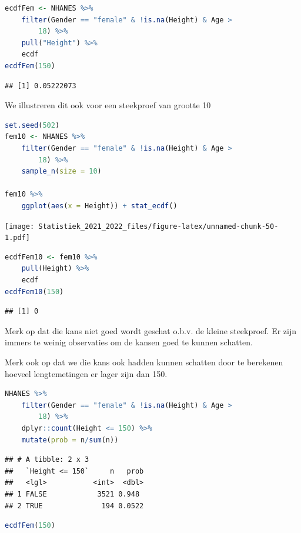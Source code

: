 \documentclass[
  12pt,dutch,coursenotes]{book}
\theoremstyle{definition}
\theoremstyle{definition}
\theoremstyle{definition}
\theoremstyle{definition}
\theoremstyle{remark}
\begin{document}
\begin{lstlisting}[language=R]
ecdfFem <- NHANES %>%
    filter(Gender == "female" & !is.na(Height) & Age >
        18) %>%
    pull("Height") %>%
    ecdf
ecdfFem(150)
\end{lstlisting}

\begin{lstlisting}
## [1] 0.05222073
\end{lstlisting}

We illustreren dit ook voor een steekproef van grootte 10

\begin{lstlisting}[language=R]
set.seed(502)
fem10 <- NHANES %>%
    filter(Gender == "female" & !is.na(Height) & Age >
        18) %>%
    sample_n(size = 10)

fem10 %>%
    ggplot(aes(x = Height)) + stat_ecdf()
\end{lstlisting}

\texttt{[image: Statistiek\_2021\_2022\_files/figure-latex/unnamed-chunk-50-1.pdf]}

\begin{lstlisting}[language=R]
ecdfFem10 <- fem10 %>%
    pull(Height) %>%
    ecdf
ecdfFem10(150)
\end{lstlisting}

\begin{lstlisting}
## [1] 0
\end{lstlisting}

Merk op dat die kans niet goed wordt geschat o.b.v. de kleine steekproef. Er zijn immers te weinig observaties om de kansen goed te kunnen schatten.

Merk ook op dat we die kans ook hadden kunnen schatten door te berekenen hoeveel lengtemetingen er lager zijn dan 150.

\begin{lstlisting}[language=R]
NHANES %>%
    filter(Gender == "female" & !is.na(Height) & Age >
        18) %>%
    dplyr::count(Height <= 150) %>%
    mutate(prob = n/sum(n))
\end{lstlisting}

\begin{lstlisting}
## # A tibble: 2 x 3
##   `Height <= 150`     n   prob
##   <lgl>           <int>  <dbl>
## 1 FALSE            3521 0.948 
## 2 TRUE              194 0.0522
\end{lstlisting}

\begin{lstlisting}[language=R]
ecdfFem(150)
\end{lstlisting}
\end{document}
